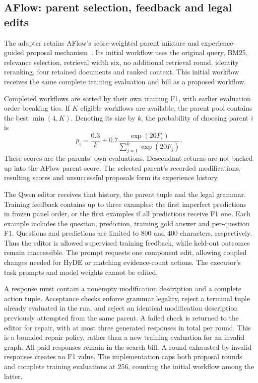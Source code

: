 \subsection{AFlow: parent selection, feedback and legal edits}
\label{sec:aflow-rag-adapter}
The adapter retains AFlow's score-weighted parent mixture and
experience-guided proposal mechanism~\citep{zhang2024aflow}. Its initial
workflow uses the original query, BM25, relevance selection, retrieval
width six, no additional retrieval round, identity reranking, four retained
documents and ranked context. This initial workflow receives the same
complete training evaluation and bill as a proposed workflow.

Completed workflows are sorted by their own training F1, with earlier
evaluation order breaking ties. If $K$ eligible workflows are available,
the parent pool contains the best $\min(4,K)$. Denoting its size by $k$,
the probability of choosing parent $i$ is
\[
 p_i=\frac{0.3}{k}
       +0.7\frac{\exp(20F_i)}{\sum_{j=1}^{k}\exp(20F_j)}.
\]
These scores are the parents' own evaluations. Descendant returns are not
backed up into the AFlow parent score. The selected parent's recorded
modifications, resulting scores and unsuccessful proposals form its
experience history.

The Qwen editor receives that history, the parent tuple and the legal
grammar. Training feedback contains up to three examples: the first
imperfect predictions in frozen panel order, or the first examples if all
predictions receive F1 one. Each example includes the question, prediction,
training gold answer and per-question F1. Questions and predictions are
limited to 800 and 400 characters, respectively. Thus the editor is allowed
supervised training feedback, while held-out outcomes remain inaccessible.
The prompt requests one component edit, allowing coupled changes needed
for HyDE or matching evidence-count actions. The executor's task prompts
and model weights cannot be edited.

A response must contain a nonempty modification description and a complete
action tuple. Acceptance checks enforce grammar legality, reject a terminal
tuple already evaluated in the run, and reject an identical modification
description previously attempted from the same parent. A failed check is
returned to the editor for repair, with at most three generated responses
in total per round. This is a bounded repair policy, rather than a new
training evaluation for an invalid graph. All paid responses remain in the
search bill. A round exhausted by invalid responses creates no F1 value.
The implementation caps both proposal rounds and complete training
evaluations at 256, counting the initial workflow among the latter.

